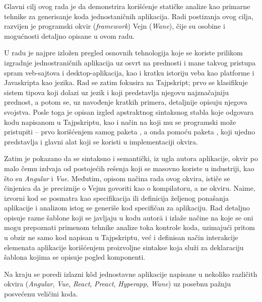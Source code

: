Glavni cilj ovog rada je da demonstrira korišćenje statičke analize kao primarne tehnike za generisanje koda jednostaničnih aplikacija.
Radi postizanja ovog cilja, razvijen je programski okvir (\textsl{framework}) Vejn (\textsl{Wane}), čije su osobine i mogućnosti detaljno opisane u ovom radu.

U radu je najpre izložen pregled osnovnih tehnologija koje se koriste prilikom izgradnje jednostraničnih aplikacija uz osvrt na prednosti i mane takvog pristupa spram veb-sajtova i desktop-aplikacija, kao i kratku istoriju veba kao platforme i Javaskripta kao jezika.
Rad se zatim fokusira na Tajpskript; prvo se klasifikuje sistem tipova koji dolazi uz jezik i koji predstavlja njegovu najznačajniju prednost, a potom se, uz navođenje kratkih primera, detaljnije opisuju njegova svojstva.
Posle toga je opisan izgled apstraktnog sintaksnog stabla koje odgovara kodu napisanom u Tajpskriptu, kao i način na koji mu se programski može pristupiti -- prvo korišćenjem samog paketa , a onda pomoću paketa , koji ujedno predstavlja i glavni alat koji se koristi u implementaciji okvira.

Zatim je pokazano da se sintaksno i semantički, iz ugla autora aplikacije, okvir po malo čemu izdvaja od postojećih rešenja koji se masovno koriste u industriji, kao što su \textsl{Angular} i \textsl{Vue}.
Međutim, opisom načina rada ovog okvira, ističe se činjenica da je preciznije o Vejnu govoriti kao o kompilatoru, a ne okviru.
Naime, izvorni kod se posmatra kao specifikacija ili definicija željenog ponašanja aplikacije i analizom istog se generiše kod specifičan za aplikaciju.
Rad detaljno opisuje razne šablone koji se javljaju u kodu autor\=a i izlaže načine na koje se oni mogu prepoznati primenom tehnike analize toka kontrole koda, uzimajući pritom u obzir ne samo kod napisan u Tajpskriptu, već i definisan način interakcije elemenata aplikacije korišćenjem proizvoljne sintakse koja služi za deklaraciju šablona kojima se opisuje pogled komponenti.

Na kraju se poredi izlazni kôd jednostavne  aplikacije napisane u nekoliko različith okvira (\textsl{Angular}, \textsl{Vue}, \textsl{React}, \textsl{Preact}, \textsl{Hyperapp}, \textsl{Wane}) uz posebnu pažnju posvećenu veličini koda.
